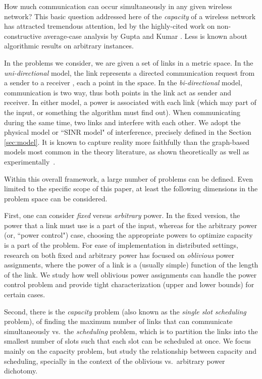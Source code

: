 \documentclass[11pt]{amsart}
\begin{document}
How much communication can occur simultaneously in any given wireless
network? This basic question addressed here of the \emph{capacity} of
a wireless network has attracted tremendous attention, led by 
the highly-cited work on non-constructive average-case analysis by
Gupta and Kumar \cite{kumar00}. Less is known about algorithmic
results on arbitrary instances.



In the problems we consider, we are given a set of links in a
metric space.  In the \emph{uni-directional} model, the link 
represents a directed communication request from a sender  to a
receiver , each a point in the space. In the
\emph{bi-directional} model, communication is two way, thus both
points in the link act as sender and receiver.  In either model, a power  
is associated with each
link   (which may part of the input, or
something the algorithm must find out).  When communicating during the
same time, two links  and  interfere with each other.
We adopt the physical model or ``SINR model" of interference,
precisely defined in the Section \ref{sec:model}.
It is known to capture reality more faithfully than the graph-based
models most common in the theory literature, as shown 
theoretically as well as
experimentally~\cite{GronkMibiHoc01,MaheshwariJD08,Moscibroda2006Protocol}.

Within this overall framework, a large number of problems can be defined.
Even limited to the specific scope of this paper, at least the
following dimensions in the problem space can be considered. 

First, one can consider \emph{fixed} versus \emph{arbitrary} power.
In the fixed version, the power that a link must use is a part of the input,
whereas
for the arbitrary power (or, ``power control") case, 
choosing the appropriate powers to optimize capacity is a part of the problem. 
For ease of implementation in distributed settings,
research on both fixed and arbitrary power
has focused on \emph{oblivious} power assignments, where the power
of a link is a (usually simple) function of the length of the link. 
We study how well oblivious power
assignments can handle the power control problem and provide
tight characterization (upper and lower bounds) for certain cases.

Second, there is the \emph{capacity} problem (also known as the
\emph{single slot scheduling} problem), of finding the
maximum number of links that can communicate simultaneously
 vs.\ the \emph{scheduling}
problem, which is to partition the links into the smallest number of 
slots such that each slot can be scheduled at
once. 
We focus mainly on the capacity problem, but study the
relationship between capacity and scheduling, specially in the context
of the oblivious vs.\ arbitrary power dichotomy.
\end{document}
